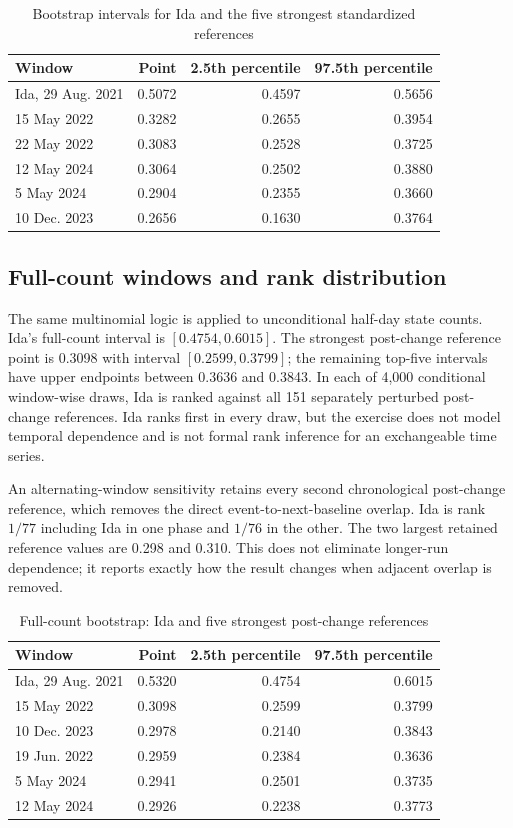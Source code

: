 \documentclass[11pt]{article}
\begin{document}
\begin{table}[t]
\centering
\caption{Bootstrap intervals for Ida and the five strongest standardized references}
\label{tab:bootstd}
\begin{tabular}{@{}lrrr@{}}
\toprule
Window & Point & 2.5th percentile & 97.5th percentile \\
\midrule
Ida, 29 Aug. 2021 & 0.5072 & 0.4597 & 0.5656 \\
15 May 2022 & 0.3282 & 0.2655 & 0.3954 \\
22 May 2022 & 0.3083 & 0.2528 & 0.3725 \\
12 May 2024 & 0.3064 & 0.2502 & 0.3880 \\
5 May 2024 & 0.2904 & 0.2355 & 0.3660 \\
10 Dec. 2023 & 0.2656 & 0.1630 & 0.3764 \\
\bottomrule
\end{tabular}
\end{table}

\subsection{Full-count windows and rank distribution}

The same multinomial logic is applied to unconditional half-day state counts. Ida's full-count interval is $[0.4754,0.6015]$. The strongest post-change reference point is 0.3098 with interval $[0.2599,0.3799]$; the remaining top-five intervals have upper endpoints between 0.3636 and 0.3843. In each of 4,000 conditional window-wise draws, Ida is ranked against all 151 separately perturbed post-change references. Ida ranks first in every draw, but the exercise does not model temporal dependence and is not formal rank inference for an exchangeable time series.

An alternating-window sensitivity retains every second chronological post-change reference, which removes the direct event-to-next-baseline overlap. Ida is rank $1/77$ including Ida in one phase and $1/76$ in the other. The two largest retained reference values are 0.298 and 0.310. This does not eliminate longer-run dependence; it reports exactly how the result changes when adjacent overlap is removed.

\begin{table}[t]
\centering
\caption{Full-count bootstrap: Ida and five strongest post-change references}
\label{tab:bootraw}
\begin{tabular}{@{}lrrr@{}}
\toprule
Window & Point & 2.5th percentile & 97.5th percentile \\
\midrule
Ida, 29 Aug. 2021 & 0.5320 & 0.4754 & 0.6015 \\
15 May 2022 & 0.3098 & 0.2599 & 0.3799 \\
10 Dec. 2023 & 0.2978 & 0.2140 & 0.3843 \\
19 Jun. 2022 & 0.2959 & 0.2384 & 0.3636 \\
5 May 2024 & 0.2941 & 0.2501 & 0.3735 \\
12 May 2024 & 0.2926 & 0.2238 & 0.3773 \\
\bottomrule
\end{tabular}
\end{table}
\end{document}
